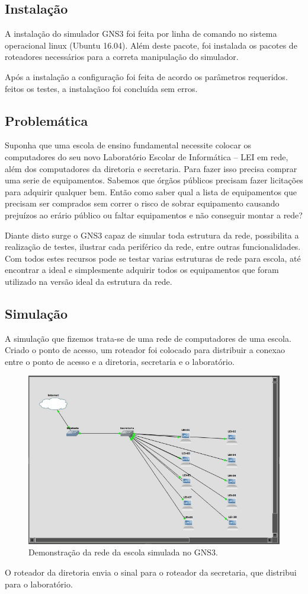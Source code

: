 \documentclass[12pt]{article}
\begin{document}
\subsection{Instalação}
A instalação do simulador GNS3 foi feita por linha de comando no sistema operacional linux (Ubuntu 16.04). Além deste pacote, foi instalada os pacotes de roteadores necessários para a correta manipulação do simulador.

Após a instalação a configuração foi feita de acordo os parâmetros requeridos. feitos os testes, a instalaçãoo foi concluída sem erros.
\subsection{Problemática} 
Suponha que uma escola de ensino fundamental necessite colocar os computadores do seu novo Laboratório Escolar de Informática – LEI em rede, além dos computadores da diretoria e secretaria. Para fazer isso precisa comprar uma serie de equipamentos. Sabemos que órgãos públicos precisam fazer licitações para adquirir qualquer bem. Então como saber qual a lista de equipamentos que precisam ser comprados sem correr o risco de sobrar equipamento causando prejuízos ao erário público ou faltar equipamentos e não conseguir montar a rede? 

Diante disto surge o GNS3 capaz de simular toda estrutura da rede, possibilita a realização de testes, ilustrar cada periférico da rede, entre outras funcionalidades. Com todos estes recursos pode se testar varias estruturas de rede para escola, até encontrar a ideal  e simplesmente adquirir todos os equipamentos que foram utilizado na versão ideal da estrutura da rede. 
\subsection{Simulação}
A simulação que fizemos trata-se de uma rede de computadores de uma escola. Criado o ponto de acesso, um roteador foi colocado para distribuir a conexao entre o ponto de acesso e a diretoria, secretaria e o laboratório.
\begin{figure}[ht]
\centering
\includegraphics[width=.9\textwidth]{internet.jpeg}
\caption { Demonstração da rede da escola simulada no GNS3.}
\label{fig:gargalo}
\end{figure}
O roteador da diretoria envia o sinal para o roteador da secretaria, que distribui para o laboratório.
\end{document}
